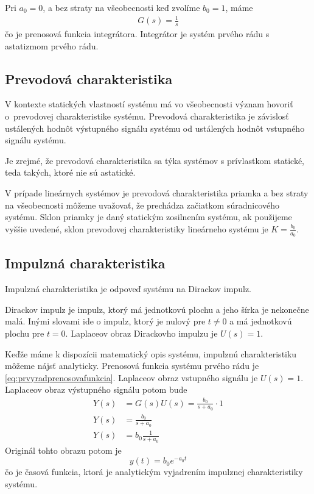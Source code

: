 \documentclass[a4paper, 10pt, ]{article}
\begin{document}
Pri $a_0 = 0$, a bez straty na všeobecnosti keď zvolíme $b_0 = 1$, máme
\begin{align}
    G(s) = \frac{1}{s}
\end{align}
čo je prenosová funkcia integrátora. Integrátor je systém prvého rádu s astatizmom prvého rádu.



\subsection{Prevodová charakteristika}

V kontexte statických vlastností systému má vo všeobecnosti význam hovoriť o~prevodovej charakteristike systému. Prevodová charakteristika je závislosť ustálených hodnôt výstupného signálu systému od ustálených hodnôt vstupného signálu systému.

Je zrejmé, že prevodová charakteristika sa týka systémov s prívlastkom statické, teda takých, ktoré nie sú astatické.

V prípade lineárnych systémov je prevodová charakteristika priamka a bez straty na všeobecnosti môžeme uvažovať, že prechádza začiatkom súradnicového systému. Sklon priamky je daný statickým zosilnením systému, ak použijeme vyššie uvedené, sklon prevodovej charakteristiky lineárneho systému je $K = \frac{b_0}{a_0}$.




\subsection{Impulzná charakteristika}

Impulzná charakteristika je odpoveď systému na Dirackov impulz.

\bigskip

Dirackov impulz je impulz, ktorý má jednotkovú plochu a jeho šírka je nekonečne malá. Inými slovami ide o impulz, ktorý je nulový pre $t \neq 0$ a má jednotkovú plochu pre $t = 0$. Laplaceov obraz Dirackovho impulzu je $U(s) = 1$.

Keďže máme k dispozícii matematický opis systému, impulznú charakteristiku môžeme nájsť analyticky. Prenosová funkcia systému prvého rádu je \eqref{eq:prvyradprenosovafunkcia}. Laplaceov obraz vstupného signálu je $U(s) = 1$. Laplaceov obraz výstupného signálu potom bude
\begin{subequations}
\begin{align}
    Y(s) &= G(s) U(s) = \frac{b_0}{s + a_0} \cdot 1 \\
    Y(s) &= \frac{b_0}{s + a_0} \\
    Y(s) &= b_0 \frac{1}{s + a_0}  
\end{align}
\end{subequations}
Originál tohto obrazu potom je
\begin{equation} \label{eq:ICH1R}
    y(t) = b_0 e^{-a_0 t} 
\end{equation}
čo je časová funkcia, ktorá je analytickým vyjadrením impulznej charakteristiky systému. 
\end{document}
